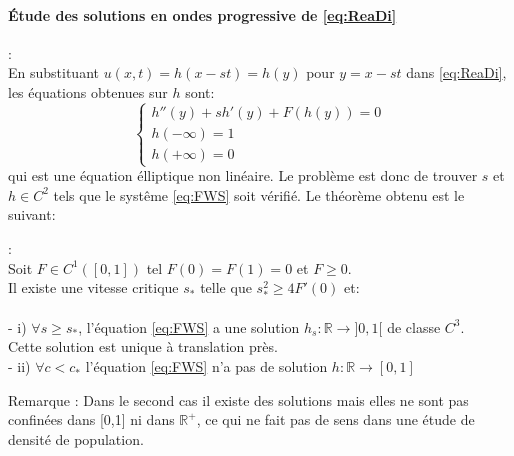 \paragraph{Étude des solutions en ondes progressive de \eqref{eq:ReaDi}}:\\
En substituant $u(x,t) = h(x-st) = h(y)$ pour $y=x-st$ dans \eqref{eq:ReaDi}, les équations obtenues sur $h$ sont: \begin{equation} \label{eq:FWS} \left\{
                \begin{array}{ll}
                h''(y)+ sh'(y)+F(h(y))=0 \\
                h(-\infty)= 1 \\  h(+\infty) =0 
                   \end{array}
              \right.
\end{equation} 
qui est une équation élliptique non linéaire. Le problème est donc de trouver $s$ et $h \in C^2$ tels que le systême \eqref{eq:FWS} soit vérifié. Le théorème obtenu est le suivant:



\begin{theorem}:\\
Soit $F \in C^1([0,1])$ tel $F(0)=F(1)=0$ et $F\geq 0$. \\
Il existe une vitesse critique $s_*$ telle que $s_*^2 \geq 4F'(0)$ et: \\ \\
- i) $\forall s \geq s_*$, l'équation \eqref{eq:FWS} a une solution $h_s:\mathbb{R} \rightarrow ]0,1[$ de classe $C^3$.\\ Cette solution est unique à translation près. \\
- ii)  $\forall c<c_*$ l'équation \eqref{eq:FWS} n'a pas de solution $h:\mathbb{R} \rightarrow [0,1]$
\end{theorem}
Remarque : Dans le second cas il existe des solutions mais elles ne sont pas confinées dans [0,1] ni dans $\mathbb{R}^+$, ce qui ne fait pas de sens dans une étude de densité de population.

\newpage

